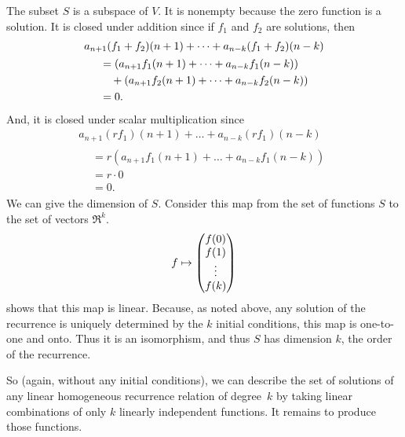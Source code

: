 The subset $S$ is a subspace of $V$.
It is nonempty because the zero function is a solution.
It is closed under addition since if $f_1$ and $f_2$ are solutions, then
\begin{multline*}
  a_{n+1}(f_1+f_2)(n+1)+\dots+a_{n-k}(f_1+f_2)(n-k) \\  
  \begin{aligned}
    &=(a_{n+1}f_1(n+1)+\dots+a_{n-k}f_1(n-k))          \\
    &\quad\hbox{}+(a_{n+1}f_2(n+1)+\dots+a_{n-k}f_2(n-k))     \\
    &=0.
  \end{aligned}
\end{multline*}
And, it is closed under scalar multiplication since
\begin{multline*}
  a_{n+1}(rf_1)(n+1)+\dots+a_{n-k}(rf_1)(n-k) \\  
  \begin{aligned}
    &=r(a_{n+1}f_1(n+1)+\dots+a_{n-k}f_1(n-k))   \\
    &=r\cdot 0                                    \\
    &=0.
  \end{aligned}
\end{multline*}
We can give the dimension of $S$.
Consider this map from the set of functions $S$ to the set of vectors $\Re^k$. 
\begin{equation*}
  f 
  \mapsto 
  \begin{pmatrix} f(0) \\ f(1) \\ \vdots \\ f(k) \end{pmatrix}
\end{equation*}
 shows that this map is linear.
Because, as noted above, 
any solution of the recurrence is uniquely determined by the $k$
initial conditions, this map is one-to-one and onto.
Thus it is an isomorphism, and thus $S$ has dimension $k$,
the order of the recurrence. 

So (again, without any initial conditions), we can describe the
set of solutions of any linear homogeneous recurrence relation of degree~$k$
by taking linear combinations of only $k$ linearly independent functions. 
It remains to produce those functions.

